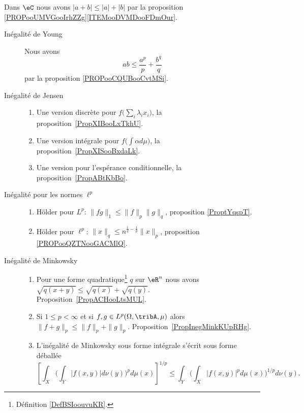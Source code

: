 
Dans \( \eC\) nous avons \( | a+ b|\leq | a |+| b |\) par la proposition \ref{PROPooUMVGooIrhZZg}\ref{ITEMooDVMDooFDmOur}.
\begin{description}
	\item[Inégalité de Young]
	      Nous avons
	      \begin{equation}
		      ab\leq \frac{ a^p }{ p }+\frac{ b^q }{ q }
	      \end{equation}
	      par la proposition \ref{PROPooCQUBooCvtMSi}.
	\item[Inégalité de Jensen]
	      \begin{enumerate}
		      \item
		            Une version discrète pour \( f\big( \sum_i\lambda_ix_i \big)\), la proposition~\ref{PropXIBooLxTkhU}.
		      \item
		            Une version intégrale pour \( f\big( \int \alpha d\mu \big)\), la proposition~\ref{PropXISooBxdaLk}.
		      \item
		            Une version pour l'espérance conditionnelle, la proposition~\ref{PropABtKbBo}.
	      \end{enumerate}
	\item[Inégalité pour les normes \(  \ell^p\)]
	      \begin{enumerate}
		      \item
		            Hölder pour \( L^p\): \( \| fg \|_1\leq \| f \|_p\| g \|_q\), proposition \ref{ProptYqspT}.
		      \item
		            Hölder pour \( \ell^p\): \( \| x \|_q\leq n^{\frac{1}{ q }-\frac{1}{ p }}\| x \|_p\), proposition \ref{PROPooQZTNooGACMlQ}.
	      \end{enumerate}
	\item[Inégalité de Minkowsky]
	      \begin{enumerate}
		      \item
		            Pour une forme quadratique\footnote{Définition \ref{DefBSIoouvuKR}.} \( q\) sur \( \eR^n\) nous avons \( \sqrt{q(x+y)}\leq\sqrt{q(x)}+\sqrt{q(y)}\). Proposition~\ref{PropACHooLtsMUL}.
		      \item
		            Si \( 1\leq p<\infty\) et si \( f,g\in L^p(\Omega,\tribA,\mu)\) alors \(  \| f+g \|_p\leq \| f \|_p+\| g \|_p\). Proposition~\ref{PropInegMinkKUpRHg}.
		      \item
		            L'inégalité de Minkowsky sous forme intégrale s'écrit sous forme déballée
		            \begin{equation*}
			            \left[ \int_X\Big( \int_Y| f(x,y) |d\nu(y) \Big)^pd\mu(x) \right]^{1/p}\leq \int_Y\Big( \int_X| f(x,y) |^pd\mu(x) \Big)^{1/p}d\nu(y).

\end{equation*}
\end{enumerate}
\end{description}
